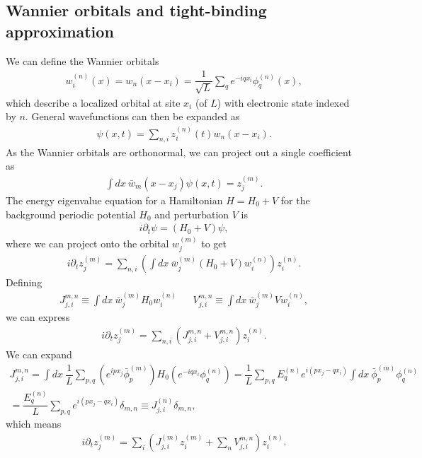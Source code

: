 \documentclass[aps,notitlepage,nofootinbib,10pt]{revtex4-1}
\newcommand{\f}[2]{\dfrac{#1}{#2}} %
\newcommand{\p}[1]{\left(#1\right)} %
\renewcommand{\d}{\partial} %
\newcommand{\1}{\mathds{1}}
\begin{document}
\subsection{Wannier orbitals and tight-binding approximation}

We can define the Wannier orbitals
\begin{align}
  w_i^{\p n}\p{x} = w_n\p{x-x_i}
  = \f1{\sqrt{L}}\sum_q e^{-iqx_i}\phi_q^{\p n}\p{x},
\end{align}
which describe a localized orbital at site $x_i$ (of $L$) with
electronic state indexed by $n$. General wavefunctions can then be
expanded as
\begin{align}
  \psi\p{x,t} = \sum_{n,i}z_i^{\p n}\p{t}w_n\p{x-x_i}.
\end{align}
As the Wannier orbitals are orthonormal, we can project out a single
coefficient as
\begin{align}
  \int dx~ \bar w_m\p{x-x_j}\psi\p{x,t} = z_j^{\p m}.
\end{align}
The energy eigenvalue equation for a Hamiltonian $H=H_0+V$ for the
background periodic potential $H_0$ and perturbation $V$ is
\begin{align}
  i\d_t\psi = \p{H_0+V}\psi,
\end{align}
where we can project onto the orbital $w_j^{\p m}$ to get
\begin{align}
  i\d_t z_j^{\p m}
  = \sum_{n,i}\p{\int dx~\bar w_j^{\p m} \p{H_0 + V} w_i^{\p n}}z_i^{\p n}.
\end{align}
Defining
\begin{align}
  J_{j,i}^{m,n} \equiv \int dx~\bar w_j^{\p m} H_0 w_i^{\p n}
  && V_{j,i}^{m,n} \equiv \int dx~\bar w_j^{\p m} V w_i^{\p n},
\end{align}
we can express
\begin{align}
  i\d_t z_j^{\p m}
  = \sum_{n,i}\p{J_{j,i}^{m,n} + V_{j,i}^{m,n}}z_i^{\p n}.
\end{align}
We can expand
\begin{multline}
  J_{j,i}^{m,n}
  = \int dx~\f1L\sum_{p,q}
  \p{e^{ipx_j}\bar \phi_p^{\p m}}H_0\p{e^{-iqx_i}\phi_q^{\p n}}
  = \f1L\sum_{p,q}E_q^{\p n}e^{i\p{px_j-qx_i}}
  \int dx~ \bar \phi_p^{\p m}\phi_q^{\p n} \\
  = \f{E_q^{\p n}}{L}\sum_{p,q}e^{i\p{px_j-qx_i}}\delta_{m,n}
  \equiv J_{j,i}^{\p n}\delta_{m,n},
\end{multline}
which means
\begin{align}
  i\d_t z_j^{\p m}
  = \sum_i\p{J_{j,i}^{\p m}z_i^{\p m} + \sum_nV_{j,i}^{m,n}}z_i^{\p n}.
\end{align}
\end{document}
